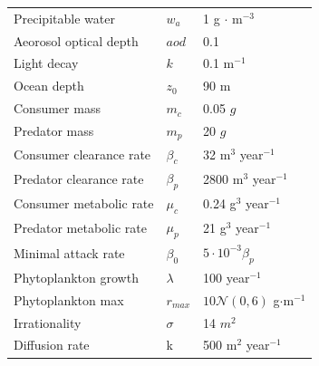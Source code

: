 \begin{tabular}{l | l | l}
  Precipitable water & $w_a$ & 1 g $\cdot$ m$^{-3}$\\
  Aeorosol optical depth & $aod$ & 0.1 \\
  Light decay & $k$ & 0.1 m$^{-1}$\\
  Ocean depth & $z_0$ & 90 m \\
  Consumer mass & $m_c$ & 0.05 $g$ \\
  Predator mass & $m_p$ & 20 $g$ \\
  Consumer clearance rate & $\beta_c$ & 32 m$^{3}$ year$^{-1}$ \\
  Predator clearance rate & $\beta_p$ & 2800 m$^3$ year$^{-1}$ \\
  Consumer metabolic rate & $\mu_c$ & 0.24 g$^{3}$ year$^{-1}$ \\
  Predator metabolic rate & $\mu_p$ & 21 g$^3$ year$^{-1}$ \\
  Minimal attack rate & $\beta_0$ & $5 \cdot 10^{-3} \beta_p$ \\
  Phytoplankton growth & $\lambda$ & 100 year$^{-1}$ \\
  Phytoplankton max & $r_{max}$ & $10\mathcal{N}(0,6)$ g$\cdot$m$^{-1}$ \\
  Irrationality & $\sigma$ & 14 $m^2$ \\
  Diffusion rate & k & 500 m$^{2}$ year$^{-1}$
\end{tabular}

